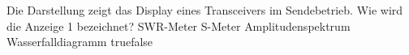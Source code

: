     {Die Darstellung zeigt das Display eines Transceivers im Sendebetrieb. Wie wird die Anzeige 1 bezeichnet?}
    {SWR-Meter}
    {S-Meter}
    {Amplitudenspektrum}
    {Wasserfalldiagramm}
    {true}{false}